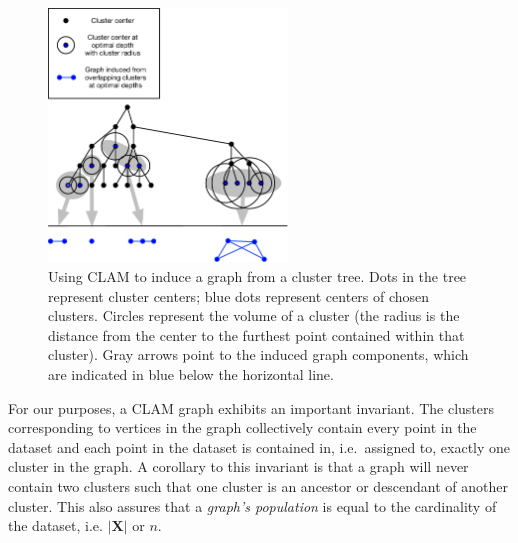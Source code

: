 \begin{figure}[ht!]
    \centering
    \includegraphics[width=2.5in]{images/tree-graph.pdf}
    \caption{Using CLAM to induce a graph from a cluster tree.
        Dots in the tree represent cluster centers;
        blue dots represent centers of chosen clusters.
        Circles represent the volume of a cluster (the radius is the distance from the center to the furthest point contained within that cluster).
        Gray arrows point to the induced graph components, which are indicated in blue below the horizontal line.}
    \label{fig:methods:graph-generation}
\end{figure}

For our purposes, a CLAM graph exhibits an important invariant.
The clusters corresponding to vertices in the graph collectively contain every point in the dataset and each point in the dataset is contained in, i.e.\ assigned to, exactly one cluster in the graph.
A corollary to this invariant is that a graph will never contain two clusters such that one cluster is an ancestor or descendant of another cluster.
This also assures that a \textit{graph's population} is equal to the cardinality of the dataset, i.e. $|\textbf{X}|$ or $n$.




